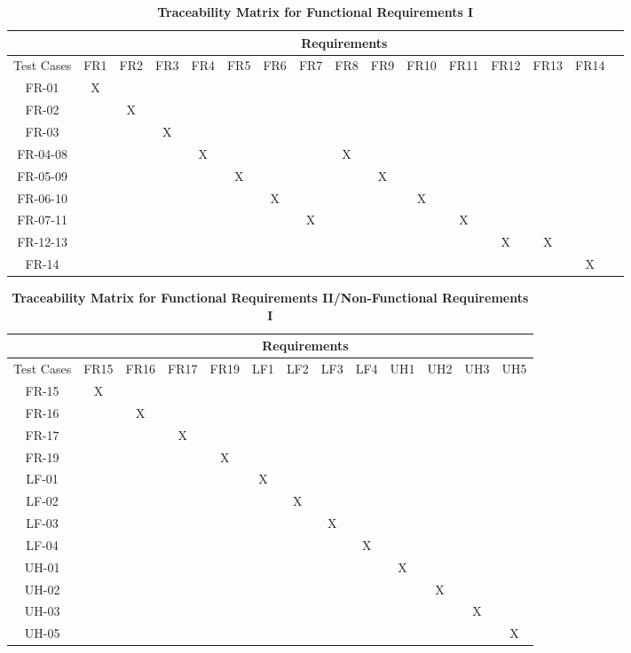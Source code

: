 \documentclass[12pt, titlepage]{article}
\begin{document}
\begin{landscape}

\begin{table}[h!]
\centering
\caption{\textbf{Traceability Matrix for Functional Requirements I}}
\label{tab:trace_matrix_01}
\begin{tabular}{|c|c|c|c|c|c|c|c|c|c|c|c|c|c|c|c|}
\hline
& \multicolumn{14}{c|}{Requirements} \\
\hline
Test Cases & FR1 & FR2 & FR3 & FR4 & FR5 & FR6 & FR7 & FR8 & FR9 & FR10 & FR11 & FR12 & FR13 & FR14 \\
\hline
FR-01 & X & & & & & & & & & & & & & \\
\hline
FR-02 & & X & & & & & & & & & & & & \\
\hline
FR-03 & & & X & & & & & & & & & & & \\
\hline
FR-04-08 & & & & X & & & & X & & & & & & \\
\hline
FR-05-09 & & & & & X & & & & X & & & & & \\
\hline
FR-06-10 & & & & & & X & & & & X & & & & \\
\hline
FR-07-11 & & & & & & & X & & & & X & & & \\
\hline
FR-12-13 & & & & & & & & & & & & X & X & \\
\hline
FR-14 & & & & & & & & & & & & & & X \\
\hline
\end{tabular}
\end{table}

\newpage

\begin{table}[h!]
\centering
\caption{\textbf{Traceability Matrix for Functional Requirements II/Non-Functional Requirements I}}
\label{tab:trace_matrix_02}
\begin{tabular}{|c|c|c|c|c|c|c|c|c|c|c|c|c|}
\hline
& \multicolumn{12}{c|}{Requirements} \\
\hline
Test Cases & FR15 & FR16 & FR17 & FR19 & LF1 & LF2 & LF3 & LF4 & UH1 & UH2 & UH3 & UH5 \\
\hline
FR-15 & X & & & & & & & & & & & \\
\hline
FR-16 & & X & & & & & & & & & & \\
\hline
FR-17 & & & X & & & & & & & & & \\
\hline
FR-19 & & & & X & & & & & & & & \\
\hline
LF-01 & & & & & X & & & & & & & \\
\hline
LF-02 & & & & & & X & & & & & & \\
\hline
LF-03 & & & & & & & X & & & & & \\
\hline
LF-04 & & & & & & & & X & & & & \\
\hline
UH-01 & & & & & & & & & X & & & \\
\hline
UH-02 & & & & & & & & & & X & & \\
\hline
UH-03 & & & & & & & & & & & X & \\
\hline
UH-05 & & & & & & & & & & & & X \\
\hline
\end{tabular}
\end{table}


\end{landscape}
\end{document}

